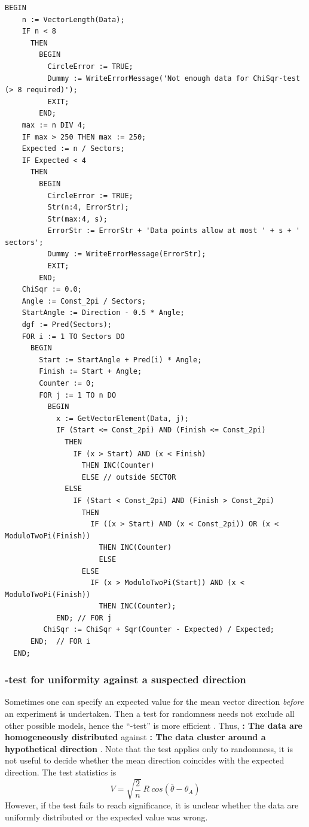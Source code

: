 \begin{refsection}
\begin{lstlisting}[caption=\skalar{\chi^2}-test for homogeneous distribution]
  BEGIN
    n := VectorLength(Data);
    IF n < 8
      THEN
        BEGIN
          CircleError := TRUE;
          Dummy := WriteErrorMessage('Not enough data for ChiSqr-test (> 8 required)');
          EXIT;
        END;
    max := n DIV 4;
    IF max > 250 THEN max := 250;
    Expected := n / Sectors;
    IF Expected < 4
      THEN
        BEGIN
          CircleError := TRUE;
          Str(n:4, ErrorStr);
          Str(max:4, s);
          ErrorStr := ErrorStr + 'Data points allow at most ' + s + ' sectors';
          Dummy := WriteErrorMessage(ErrorStr);
          EXIT;
        END;
    ChiSqr := 0.0;
    Angle := Const_2pi / Sectors;
    StartAngle := Direction - 0.5 * Angle;
    dgf := Pred(Sectors);
    FOR i := 1 TO Sectors DO
      BEGIN
        Start := StartAngle + Pred(i) * Angle;
        Finish := Start + Angle;
        Counter := 0;
        FOR j := 1 TO n DO
          BEGIN
            x := GetVectorElement(Data, j);
            IF (Start <= Const_2pi) AND (Finish <= Const_2pi)
              THEN
                IF (x > Start) AND (x < Finish)
                  THEN INC(Counter)
                  ELSE // outside SECTOR
              ELSE
                IF (Start < Const_2pi) AND (Finish > Const_2pi)
                  THEN
                    IF ((x > Start) AND (x < Const_2pi)) OR (x < ModuloTwoPi(Finish))
                      THEN INC(Counter)
                      ELSE
                  ELSE
                    IF (x > ModuloTwoPi(Start)) AND (x < ModuloTwoPi(Finish))
                      THEN INC(Counter);
            END; // FOR j
         ChiSqr := ChiSqr + Sqr(Counter - Expected) / Expected;
      END;  // FOR i
  END;
\end{lstlisting}

\subsubsection{-test for uniformity against a suspected direction}

Sometimes one can specify an expected value for the mean vector direction \emph{before} an experiment is undertaken. Then a test for randomness needs not exclude all other possible models, hence the ``-test'' is more efficient \parencite{Gre-55}. Thus, \textbf{: The data are homogeneously distributed} against \textbf{: The data cluster around a hypothetical direction }. Note that the test applies only to randomness, it is not useful to decide whether the mean direction coincides with the expected direction. The test statistics is
\begin{equation}
  V = \sqrt{\frac{2}{n}}\ R\ cos(\bar{\theta} - \theta_A)
\end{equation}
However, if the test fails to reach significance, it is unclear whether the data are uniformly distributed or the expected value was wrong.


\end{refsection}
